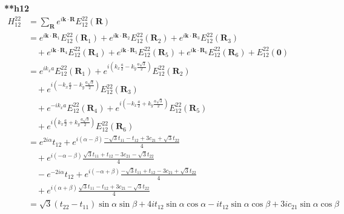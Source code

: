 \documentclass{article}
\begin{document}
\textbf{**h12}
\begin{align*}
    H^{22}_{12} & = \sum_{\mathbf{R}} e^{i \mathbf{k} \cdot \mathbf{R}} E^{22}_{12}(\mathbf{R})                             \\
                & = e^{i \mathbf{k} \cdot \mathbf{R}_1} E^{22}_{12}(\mathbf{R}_1)
    + e^{i \mathbf{k} \cdot \mathbf{R}_2} E^{22}_{12}(\mathbf{R}_2)
    + e^{i \mathbf{k} \cdot \mathbf{R}_3} E^{22}_{12}(\mathbf{R}_3)                                                         \\
                & \quad + e^{i \mathbf{k} \cdot \mathbf{R}_4} E^{22}_{12}(\mathbf{R}_4)
    + e^{i \mathbf{k} \cdot \mathbf{R}_5} E^{22}_{12}(\mathbf{R}_5)
    + e^{i \mathbf{k} \cdot \mathbf{R}_6} E^{22}_{12}(\mathbf{R}_6)
    + E^{22}_{12}(\mathbf{0})                                                                                               \\
                & = e^{i k_x a} E^{22}_{12}(\mathbf{R}_1)
    + e^{i \left( k_x \frac{a}{2} - k_y \frac{a\sqrt{3}}{2} \right)} E^{22}_{12}(\mathbf{R}_2)                              \\
                & \quad + e^{i \left( -k_x \frac{a}{2} - k_y \frac{a\sqrt{3}}{2} \right)} E^{22}_{12}(\mathbf{R}_3)         \\
                & \quad + e^{-i k_x a } E^{22}_{12}(\mathbf{R}_4)
    + e^{i \left( -k_x \frac{a}{2} + k_y \frac{a\sqrt{3}}{2} \right)} E^{22}_{12}(\mathbf{R}_5)                             \\
                & \quad + e^{i \left( k_x \frac{a}{2} + k_y \frac{a\sqrt{3}}{2} \right)} E^{22}_{12}(\mathbf{R}_6)          \\
                & = e^{2i\alpha} t_{12}
    + e^{i \left( \alpha - \beta \right)} \frac{-\sqrt{3}t_{11} - t_{12} + 3c_{21} + \sqrt{3}t_{22}}{4}                     \\
                & \quad + e^{i \left( -\alpha - \beta \right)} \frac{\sqrt{3}t_{11} + t_{12} - 3c_{21} - \sqrt{3}t_{22}}{4} \\
                & \quad - e^{-2i\alpha} t_{12}
    + e^{i \left( -\alpha + \beta \right)} \frac{-\sqrt{3}t_{11} + t_{12} - 3c_{21} + \sqrt{3}t_{22}}{4}                    \\
                & \quad + e^{i \left( \alpha + \beta \right)} \frac{\sqrt{3}t_{11} - t_{12} + 3c_{21} - \sqrt{3}t_{22}}{4}  \\
                & = \sqrt{3}(t_{22} - t_{11}) \sin\alpha \sin\beta
    + 4i t_{12} \sin\alpha \cos \alpha - i t_{12} \sin\alpha \cos\beta  + 3i c_{21} \sin\alpha \cos\beta \nonumber
\end{align*}
\end{document}

